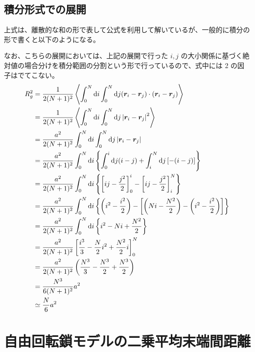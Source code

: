 \documentclass[a4paper,11pt]{ltjsarticle}
\begin{document}
\begin{appendix}

\subsection{積分形式での展開}


上式は、離散的な和の形で表して公式を利用して解いているが、一般的に積分の形で書くと以下のようになる。

なお、こちらの展開においては、上記の展開で行った $i , j$ の大小関係に基づく絶対値の場合分けを積分範囲の分割という形で行っているので、式中には 2 の因子はでてこない。
\begin{align*}
R_g^2 
	&= \dfrac{1}{2(N+1)^2} \left \langle \int_{0}^N \odif{i} \int_{0}^N \odif{j} (\bm{r}_i - \bm{r}_j) \cdot (\bm{r}_i - \bm{r}_j) \right \rangle\\
	&= \dfrac{1}{2(N+1)^2} \left \langle \int_{0}^N \odif{i} \int_{0}^{N} \odif{j} \left|\bm{r}_i - \bm{r}_j \right|^2 \right \rangle\\
	&= \dfrac{a^2}{2(N+1)^2} \int_{0}^N \odif{i} \int_{0}^{N} \odif{j} \left|\bm{r}_i - \bm{r}_j \right| \\
	&= \dfrac{a^2}{2(N+1)^2} \int_{0}^N \odif{i} \left\{ \int_{0}^{i} \odif{j} (i -j) + \int_i^N \odif{j} \left[ -(i-j) \right] \right\} \\
	&= \dfrac{a^2}{2(N+1)^2} \int_{0}^N \odif{i} \left\{ \left [ij - \dfrac{j^2}{2} \right]_0^i - \left[ ij - \dfrac{j^2}{2} \right]_i^N \right\} \\
	&= \dfrac{a^2}{2(N+1)^2} \int_{0}^N \odif{i} \left\{ \left (i^2 - \dfrac{i^2}{2} \right) - \left[ \left(Ni - \dfrac{N^2}{2} \right) - \left (i^2 - \dfrac{i^2}{2} \right) \right] \right\} \\
	&= \dfrac{a^2}{2(N+1)^2} \int_{0}^N \odif{i} \left\{ i^2 - Ni + \dfrac{N^2}{2} \right\} \\
	&= \dfrac{a^2}{2(N+1)^2} \left[ \dfrac{i^3}{3} - \dfrac{N}{2}i^2 + \dfrac{N^2}{2} i \right]_0^N \\
	&= \dfrac{a^2}{2(N+1)^2} \left( \dfrac{N^3}{3} - \dfrac{N^3}{2} + \dfrac{N^3}{2} \right) \\
	&= \dfrac{N^3 }{6(N+1)^2} a^2\\
	&\simeq \dfrac{N}{6} a^2\\
\end{align*}
\newpage

\section{自由回転鎖モデルの二乗平均末端間距離}
\label{sec:1FR_R2}


\end{appendix}
\end{document}
